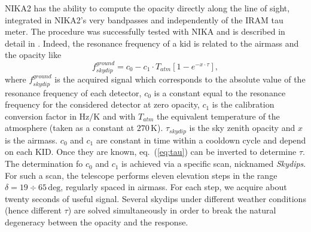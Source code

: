 \documentclass[]{aa} %
\begin{document}
NIKA2 has the ability to compute the opacity directly along the line of sight, integrated in NIKA2's very bandpasses and independently of the IRAM tau meter. The procedure was successfully tested with NIKA and is described in detail in \cite{Catalano2014}. Indeed, the resonance frequency of a kid is related to the airmass and the opacity like
\begin{equation}\label{eq:skydip}
f^{ground}_{skydip} = c_0 - c_1 \cdot T_{atm}[1 - e^{- x \cdot \tau}],
\label{eq:tau}
\end{equation}
where $f^{ground}_{skydip}$ is the acquired signal which corresponds to the absolute value of the resonance frequency of each detector, $c_0$ is a constant equal to the resonance frequency for the considered detector at zero opacity, $c_1$ is the calibration conversion factor in $\mathrm{Hz/K}$ and with $T_{atm}$ the equivalent temperature of the atmosphere (taken as a constant at $270\,\mathrm{K}$).  $\tau_{skydip}$ is the sky zenith opacity and $x$ is the airmass. $c_0$ and $c_1$ are constant in time within a cooldown cycle and depend on each KID. Once they are known, eq.~(\ref{eq:tau}) can be inverted to determine $\tau$. The determination fo $c_0$ and $c_1$ is achieved via a specific scan, nicknamed \emph{Skydips}. For such a scan, the telescope performs eleven elevation steps in the range $\delta = 19\div65\,\mathrm{deg}$, regularly spaced in airmass. For each step, we acquire about twenty seconds of useful signal. Several skydips under different weather conditions (hence different $\tau$) are solved simultaneously in order to break the natural degeneracy between the opacity and the response.
\end{document}
